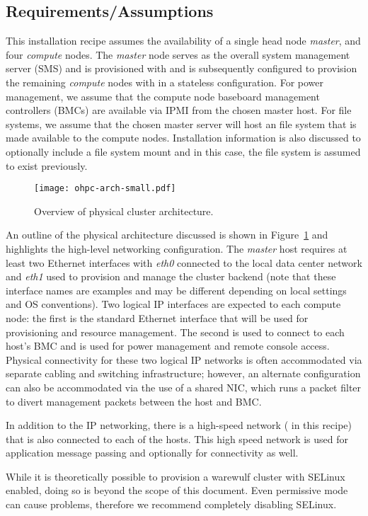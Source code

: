 \subsection{Requirements/Assumptions}
This installation recipe assumes the availability of a single head node {\em
  master}, and four {\em compute} nodes. The {\em master} node serves as the
overall system management server (SMS) and is provisioned with \baseOS{} and is
subsequently configured to provision the remaining {\em compute} nodes with
\Warewulf{} in a stateless configuration. For power management, we assume that
the compute node baseboard management controllers (BMCs) are available via IPMI
from the chosen master host. For file systems, we assume that the chosen master
server will host an \NFS{} file system that is made available to the compute
nodes. Installation information is also discussed to optionally include a
\Lustre{} file system mount and in this case, the \Lustre{} file system is
assumed to exist previously.

\begin{figure}[hbt]
\center
\texttt{[image: ohpc-arch-small.pdf]}
\vspace*{-0.2cm}
\caption{Overview of physical cluster architecture.} \label{fig:physical_arch}
\end{figure}
\mbox{}

An outline of the physical architecture discussed is shown in
Figure~\ref{fig:physical_arch} and highlights the high-level networking
configuration. The {\em master} host requires at least two Ethernet interfaces
with {\em eth0} connected to the local data center network and {\em eth1} used
to provision and manage the cluster backend (note that these interface names
are examples and may be different depending on local settings and OS
conventions).  Two logical IP interfaces are expected to each compute node: the
first is the standard Ethernet interface that will be used for provisioning and
resource management. The second is used to connect to each host's BMC and is
used for power management and remote console access. Physical connectivity for
these two logical IP networks is often accommodated via separate cabling and
switching infrastructure; however, an alternate configuration can also be
accommodated via the use of a shared NIC, which runs a packet filter to divert
management packets between the host and BMC.

 In addition to the IP networking, there is a high-speed network
(\InfiniBand{} in this recipe) that is also connected to each of the
hosts. This high speed network is used for application message passing and
optionally for \Lustre{} connectivity as well.

\begin{center}
\begin{tcolorbox}[]
\small
While it is theoretically possible to provision a warewulf cluster with SELinux
enabled, doing so is beyond the scope of this document. Even permissive mode can
cause problems, therefore we recommend completely disabling SELinux.

\end{tcolorbox}
\end{center}
